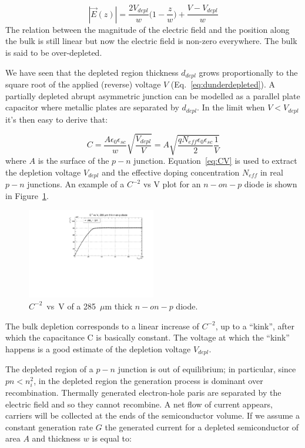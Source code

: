 \begin{equation}
|\vec{E}(z)|=\dfrac{2V_{depl}}{w}\Big(1-\dfrac{z}{w}\Big)+\dfrac{V-V_{depl}}{w}
\label{eq:EFz}
\end{equation}
 The relation between the magnitude of the electric field and the position along the bulk is still 
 linear but now the electric field is non-zero everywhere. The bulk is said to be over-depleted.
 
 We have seen that the depleted region thickness $d_{depl}$ grows proportionally to the square root of 
 the applied (reverse) voltage $V$ (Eq.~\ref{eq:dunderdepleted}). A partially depleted 
 abrupt asymmetric junction can be modelled as  a parallel plate capacitor where 
 metallic plates are separated by $d_{depl}$. In the limit when $V<V_{depl}$
 it's then easy to derive that:
 
 \begin{equation}
 C=\dfrac{A\epsilon_0\epsilon_{sc}}{w}\sqrt{\dfrac{V_{depl}}{V}}=A\sqrt{\dfrac{qN_{eff}\epsilon_0\epsilon_{sc}}{2}\dfrac{1}{V}}
 \label{eq:CV}
 \end{equation}
 where $A$ is the surface of the $p-n$ junction. Equation~\ref{eq:CV} is used to extract the 
 depletion voltage $V_{depl}$ and the effective doping concentration $N_{eff}$ in real 
 $p-n$ junctions. An example of a  $C^{-2}$ vs V plot for an $n-on-p$ diode is shown  in 
 Figure~\ref{fig:CV}. 
    
  
\begin{figure}[!htbp]
\centering
\includegraphics[width=0.5\textwidth]{C2V-n-in-p-291920-6-1GRs-GR1atGND-110704.pdf}
\caption{\label{fig:CV} $C^{-2}$~vs~V of a 285~$\mu$m thick $n-on-p$ diode.}
\end{figure}  
  
The bulk depletion corresponds to a linear increase of   $C^{-2}$, up to a ``kink'', after which the 
capacitance C is basically constant. The voltage at which the ``kink'' happens is a good estimate 
of the depletion voltage $V_{depl}$.
  
The depleted region of a $p-n$ junction is out of equilibrium; in particular, since $pn<n_i^2$, in the 
depleted region  the generation process is dominant over recombination. Thermally generated 
electron-hole paris are separated by the electric field and so they cannot recombine. A net 
flow of current appears, carriers will be collected at the ends of the semiconductor volume. 
If we assume a constant generation rate $G$ the generated current for a depleted semiconductor 
of area $A$ and thickness $w$ is equal to:

